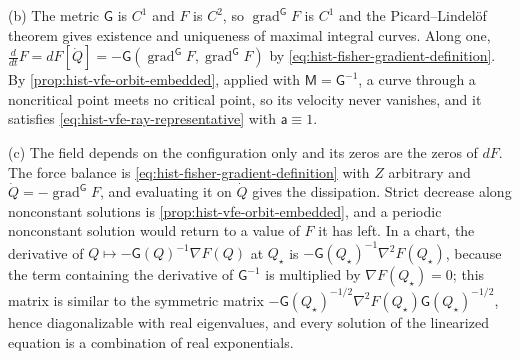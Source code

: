 (b) The metric $\mathsf G$ is $C^1$ and $F$ is $C^2$, so $\operatorname{grad}^{\mathsf G}F$ is $C^1$
and the Picard--Lindel\"of theorem gives existence and uniqueness of maximal integral curves. Along
one, $\tfrac{d}{dt}F=dF[\dot Q]=-\mathsf G(\operatorname{grad}^{\mathsf G}F,\operatorname{grad}^{\mathsf G}F)$
by \eqref{eq:hist-fisher-gradient-definition}. By \cref{prop:hist-vfe-orbit-embedded}, applied with
$\mathsf M=\mathsf G^{-1}$, a curve through a noncritical point meets no critical point, so its
velocity never vanishes, and it satisfies \eqref{eq:hist-vfe-ray-representative} with
$\mathsf a\equiv1$.

(c) The field depends on the configuration only and its zeros are the zeros of $dF$. The force
balance is \eqref{eq:hist-fisher-gradient-definition} with $Z$ arbitrary and
$\dot Q=-\operatorname{grad}^{\mathsf G}F$, and evaluating it on $\dot Q$ gives the dissipation.
Strict decrease along nonconstant solutions is \cref{prop:hist-vfe-orbit-embedded}, and a periodic
nonconstant solution would return to a value of $F$ it has left. In a chart, the derivative of
$Q\mapsto-\mathsf G(Q)^{-1}\nabla F(Q)$ at $Q_\star$ is $-\mathsf G(Q_\star)^{-1}\nabla^2F(Q_\star)$,
because the term containing the derivative of $\mathsf G^{-1}$ is multiplied by
$\nabla F(Q_\star)=0$; this matrix is similar to the symmetric matrix
$-\mathsf G(Q_\star)^{-1/2}\nabla^2F(Q_\star)\mathsf G(Q_\star)^{-1/2}$, hence diagonalizable with real
eigenvalues, and every solution of the linearized equation is a combination of real exponentials.

